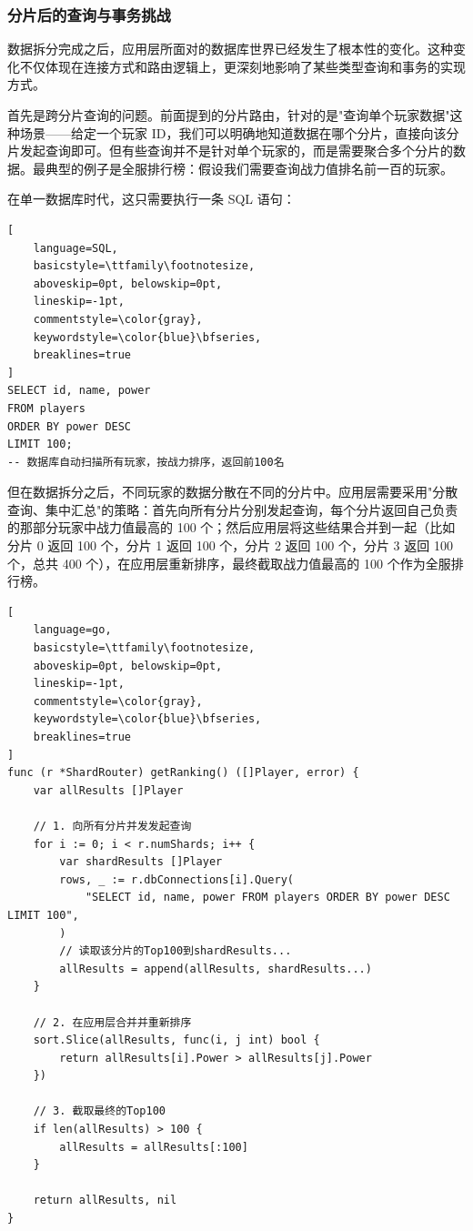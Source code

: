 \subsubsection{分片后的查询与事务挑战}

数据拆分完成之后，应用层所面对的数据库世界已经发生了根本性的变化。这种变化不仅体现在连接方式和路由逻辑上，更深刻地影响了某些类型查询和事务的实现方式。

首先是跨分片查询的问题。前面提到的分片路由，针对的是"查询单个玩家数据"这种场景——给定一个玩家 ID，我们可以明确地知道数据在哪个分片，直接向该分片发起查询即可。但有些查询并不是针对单个玩家的，而是需要聚合多个分片的数据。最典型的例子是全服排行榜：假设我们需要查询战力值排名前一百的玩家。

在单一数据库时代，这只需要执行一条 SQL 语句：

\begin{tcolorbox}[title=单一数据库中的排行榜查询]
\begin{lstlisting}[
    language=SQL,
    basicstyle=\ttfamily\footnotesize,
    aboveskip=0pt, belowskip=0pt,
    lineskip=-1pt,
    commentstyle=\color{gray},
    keywordstyle=\color{blue}\bfseries,
    breaklines=true
]
SELECT id, name, power 
FROM players 
ORDER BY power DESC 
LIMIT 100;
-- 数据库自动扫描所有玩家，按战力排序，返回前100名
\end{lstlisting}
\end{tcolorbox}

但在数据拆分之后，不同玩家的数据分散在不同的分片中。应用层需要采用"分散查询、集中汇总"的策略：首先向所有分片分别发起查询，每个分片返回自己负责的那部分玩家中战力值最高的 100 个；然后应用层将这些结果合并到一起（比如分片 0 返回 100 个，分片 1 返回 100 个，分片 2 返回 100 个，分片 3 返回 100 个，总共 400 个），在应用层重新排序，最终截取战力值最高的 100 个作为全服排行榜。

\begin{tcolorbox}[title=分片环境下的排行榜查询]
\begin{lstlisting}[
    language=go,
    basicstyle=\ttfamily\footnotesize,
    aboveskip=0pt, belowskip=0pt,
    lineskip=-1pt,
    commentstyle=\color{gray},
    keywordstyle=\color{blue}\bfseries,
    breaklines=true
]
func (r *ShardRouter) getRanking() ([]Player, error) {
    var allResults []Player
    
    // 1. 向所有分片并发发起查询
    for i := 0; i < r.numShards; i++ {
        var shardResults []Player
        rows, _ := r.dbConnections[i].Query(
            "SELECT id, name, power FROM players ORDER BY power DESC LIMIT 100",
        )
        // 读取该分片的Top100到shardResults...
        allResults = append(allResults, shardResults...)
    }
    
    // 2. 在应用层合并并重新排序
    sort.Slice(allResults, func(i, j int) bool {
        return allResults[i].Power > allResults[j].Power
    })
    
    // 3. 截取最终的Top100
    if len(allResults) > 100 {
        allResults = allResults[:100]
    }
    
    return allResults, nil
}
\end{lstlisting}
\end{tcolorbox}

